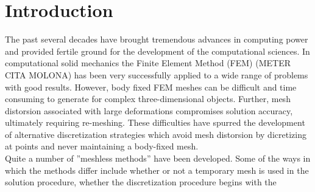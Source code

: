 
\section{Introduction}
\label{sec:intro}

The past several decades have brought tremendous advances in computing
power and provided fertile ground for the development of the
computational sciences. In computational solid mechanics the Finite
Element Method (FEM) (METER CITA MOLONA) has been very successfully
applied to a wide range of problems with good results. However, body
fixed FEM meshes can be difficult and time consuming to generate for
complex three-dimensional objects. Further, mesh distorsion associated
with large deformations compromises solution accuracy, ultimately
requiring re-meshing. These difficulties have spurred the development
of alternative discretization strategies which avoid mesh distorsion by
dicretizing at points and never
maintaining a body-fixed mesh.\\

Quite a number of ''meshless methods'' have been developed. Some of
the ways in which the methods differ include whether or not a
temporary mesh is used in the solution procedure, whether the
discretization procedure begins with the

\cite{Schreyer1994}


